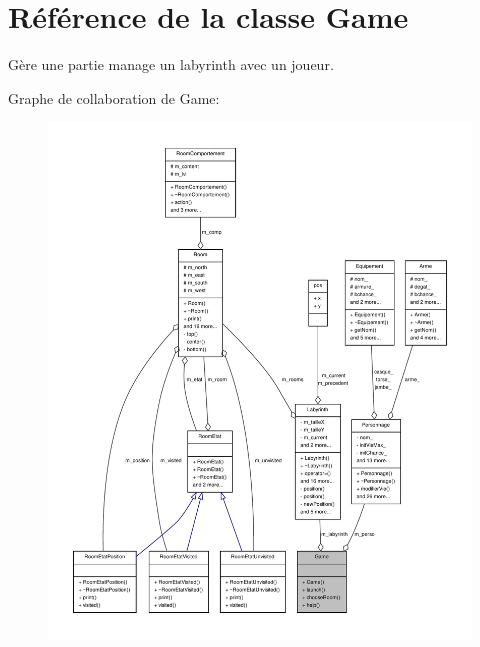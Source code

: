 \hypertarget{class_game}{\section{Référence de la classe Game}
\label{class_game}
}


Gère une partie manage un labyrinth avec un joueur.  




Graphe de collaboration de Game\-:
\nopagebreak
\begin{figure}[H]
\begin{center}
\leavevmode
\includegraphics[width=350pt]{class_game__coll__graph}
\end{center}
\end{figure}
